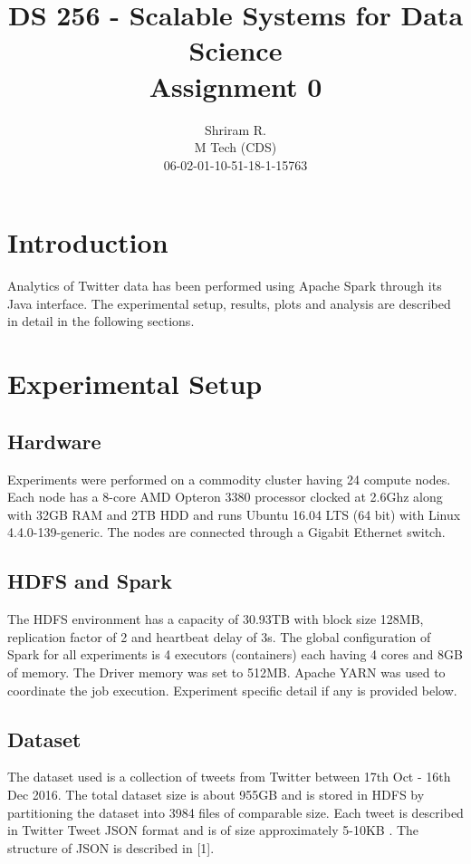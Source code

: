 \documentclass[11pt,a4paper,oneside]{article}
\begin{document}
	\title{DS 256 - Scalable Systems for Data Science \\ Assignment 0}
	\author{Shriram R. \\ M Tech (CDS) \\ 06-02-01-10-51-18-1-15763}
	\maketitle
	
	\section{Introduction}
	Analytics of Twitter data has been performed using Apache Spark through its Java interface. The experimental setup, results, plots and analysis are described in detail in the following sections.
     
    \section{Experimental Setup}
    
    \subsection{Hardware}
    Experiments were performed on a commodity cluster having 24 compute nodes. Each node has a 8-core AMD Opteron 3380 processor clocked at 2.6Ghz along with 32GB RAM and 2TB HDD and runs Ubuntu 16.04 LTS (64 bit) with Linux 4.4.0-139-generic. The nodes are connected through a Gigabit Ethernet switch.
    
    \subsection{HDFS and Spark}
    The HDFS environment has a capacity of 30.93TB with block size 128MB, replication factor of 2 and heartbeat delay of 3s. The global configuration of Spark for all experiments is 4 executors (containers) each having 4 cores and 8GB of memory. The Driver memory was set to 512MB. Apache YARN was used to coordinate the job execution. Experiment specific detail if any is provided below.
    
    \subsection{Dataset}
    The dataset used is a collection of tweets from Twitter between 17th Oct - 16th Dec 2016. The total dataset size is about 955GB and is stored in HDFS by partitioning the dataset into 3984 files of comparable size. Each tweet is described in Twitter Tweet JSON format and is of size approximately 5-10KB . The structure of JSON is described in [1].
  
\end{document}
